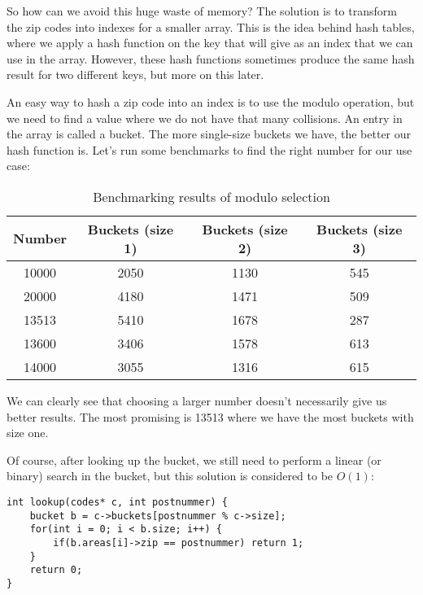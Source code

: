 \documentclass[a4paper,11pt]{article}
\begin{document}
    So how can we avoid this huge waste of memory?
    The solution is to transform the zip codes into indexes for a smaller array.
    This is the idea behind hash tables, where we apply a hash function on the key that will give as an index that we can use in the array.
    However, these hash functions sometimes produce the same hash result for two different keys, but more on this later.

    An easy way to hash a zip code into an index is to use the modulo operation, but we need to find a value where we do not have that many collisions.
    An entry in the array is called a bucket.
    The more single-size buckets we have, the better our hash function is.
    Let's run some benchmarks to find the right number for our use case:

    \begin{table}[H]
    \begin{center}
    \begin{tabular}{c|c|c|c}
    \textbf{Number} & \textbf{Buckets (size 1)} & \textbf{Buckets (size 2)} & \textbf{Buckets (size 3)}\\
    \hline
        10000     &  2050   &   1130    & 545\\
        20000    &  4180    &   1471    & 509\\
        13513    &  5410    &   1678    & 287\\
        13600    &  3406    &   1578    & 613\\
        14000    &  3055    &   1316    & 615\\
    \end{tabular}
    \caption{Benchmarking results of modulo selection}
    \label{tab:table2}
    \end{center}
    \end{table}

    We can clearly see that choosing a larger number doesn't necessarily give us better results.
    The most promising is 13513 where we have the most buckets with size one.
    
    Of course, after looking up the bucket, we still need to perform a linear (or binary) search in the bucket, but this solution is considered to be $O(1)$:

    \begin{verbatim}
int lookup(codes* c, int postnummer) {
    bucket b = c->buckets[postnummer % c->size];
    for(int i = 0; i < b.size; i++) {
        if(b.areas[i]->zip == postnummer) return 1;
    }
    return 0;
}
    \end{verbatim}
\end{document}
